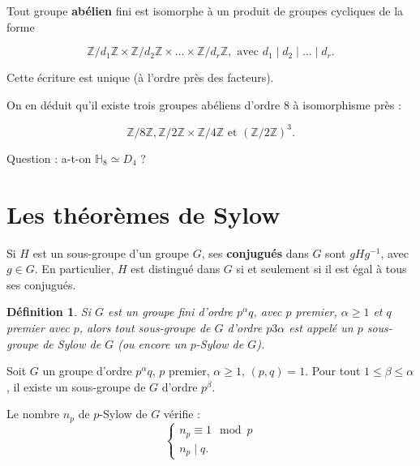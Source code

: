 \documentclass[french]{book}
\newtheorem{definition}{Définition}[section]
\begin{document}
\begin{thm}
  Tout groupe \textbf{abélien} fini est isomorphe à un produit de groupes cycliques de la forme

  \[
  \mathbb{Z}/{ d_1 }\mathbb{Z} \times \mathbb{Z}/{ d_2 }\mathbb{Z} \times \dots \times \mathbb{Z}/{ d_r }\mathbb{Z}, \text{ avec } d_1 \mid d_2 \mid \dots \mid d_r.
  \]

  Cette écriture est unique (à l'ordre près des facteurs).
\end{thm}

On en déduit qu'il existe trois groupes abéliens d'ordre 8 à isomorphisme près :

\[
\mathbb{Z}/{ 8 }\mathbb{Z}, \mathbb{Z}/{ 2 }\mathbb{Z} \times \mathbb{Z}/{ 4 }\mathbb{Z} \text{ et }  (\mathbb{Z}/{ 2 }\mathbb{Z}) ^3.
\]

Question : a-t-on $\mathbb{H}_8 \simeq D_4$ ?

\section{Les théorèmes de Sylow}

Si $H$ est un sous-groupe d'un groupe $G$, ses \textbf{conjugués} dans $G$ sont $g H g ^{-1} $, avec $g \in G$. En particulier, $H$ est distingué dans $G$ si et seulement si il est égal à tous ses conjugués.

\begin{definition}
  Si $G$ est un groupe fini d'ordre $p ^{\alpha} q$, avec $p$ premier, $\alpha \geq 1$ et $q$ premier avec $p$, alors tout sous-groupe de $G$ d'ordre $p3\alpha$ est appelé un $p$ sous-groupe de Sylow de $G$ (ou encore un $p$-Sylow de $G$).
\end{definition}

\begin{thm}
  Soit $G$ un groupe d'ordre $p ^{\alpha} q$, $p$ premier, $\alpha \geq 1$, $(p, q)=1$. Pour tout $1 \leq \beta \leq \alpha$, il existe un sous-groupe de $G$ d'ordre $p ^{\beta}$.
\end{thm}

\begin{thm}
  Le nombre $n_p$ de $p$-Sylow de $G$ vérifie :
  \[
  \begin{cases}
    n_p \equiv 1 \mod p \\
    n_p \mid q.
  \end{cases}
  \]
\end{thm}
\end{document}
